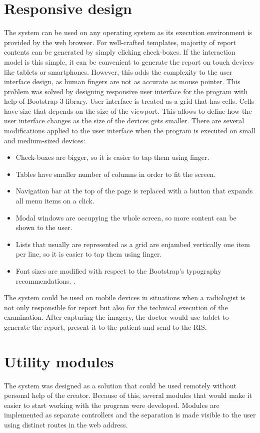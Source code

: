 \documentclass[12pt, twoside, openany]{report}
\theoremstyle{definition}
\begin{document}
\section{Responsive design}
The system can be used on any operating system as its execution environment is provided by the web browser. For well-crafted templates, majority of report contents can be generated by simply clicking check-boxes. If the interaction model is this simple, it can be convenient to generate the report on touch devices like tablets or smartphones. However, this adds the complexity to the user interface design, as human fingers are not as accurate as mouse pointer. This problem was solved by designing responsive user interface for the program with help of Bootstrap 3 library. User interface is treated as a grid that has cells. Cells have size that depends on the size of the viewport. This allows to define how the user interface changes as the size of the devices gets smaller. There are several modifications applied to the user interface when the program is executed on small and medium-sized devices:
\begin{itemize}
\item Check-boxes are bigger, so it is easier to tap them using finger.
\item Tables have smaller number of columns in order to fit the screen. 
\item Navigation bar at the top of the page is replaced with a button that expands all menu items on a click. 
\item Modal windows are occupying the whole screen, so more content can be shown to the user.
\item Lists that usually are represented as a grid are enjambed vertically one item per line, so it is easier to tap them using finger.
\item Font sizes are modified with respect to the Bootstrap's typography recommendations. \cite{bootstrap-typography}.
\end{itemize} 
The system could be used on mobile devices in situations when a radiologist is not only responsible for report but also for the technical execution of the examination. After capturing the imagery, the doctor would use tablet to generate the report, present it to the patient and send to the RIS.
\section{Utility modules}
The system was designed as a solution that could be used remotely without personal help of the creator. Because of this, several modules that would make it easier to start working with the program were developed. Modules are implemented as separate controllers and the separation is made visible to the user using distinct routes in the web address.
\end{document}
